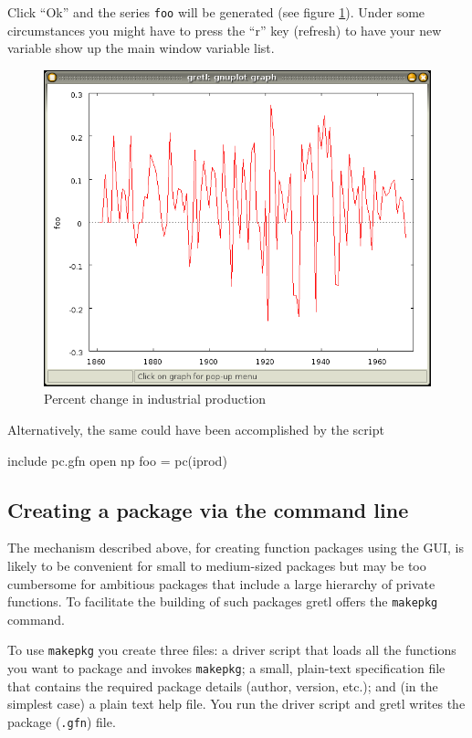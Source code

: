 Click ``Ok'' and the series \texttt{foo} will be generated (see figure
\ref{fig:iprod_pc}).  Under some circumstances you might have to press
the ``r'' key (refresh) to have your new variable show up the main
window variable list.

\begin{figure}[htbp]
  \centering
  \includegraphics[scale=0.5]{figures/iprod_pc}
  \caption{Percent change in industrial production}
  \label{fig:iprod_pc}
\end{figure}

Alternatively, the same could have been accomplished by the script
\begin{code}
include pc.gfn
open np
foo = pc(iprod)
\end{code}

\subsection{Creating a package via the command line}

The mechanism described above, for creating function packages using
the GUI, is likely to be convenient for small to medium-sized packages
but may be too cumbersome for ambitious packages that include a large
hierarchy of private functions. To facilitate the building of such
packages gretl offers the \texttt{makepkg} command.

To use \texttt{makepkg} you create three files: a driver script that
loads all the functions you want to package and invokes
\texttt{makepkg}; a small, plain-text specification file that contains
the required package details (author, version, etc.); and (in the
simplest case) a plain text help file.  You run the driver script and
gretl writes the package (\texttt{.gfn}) file.

